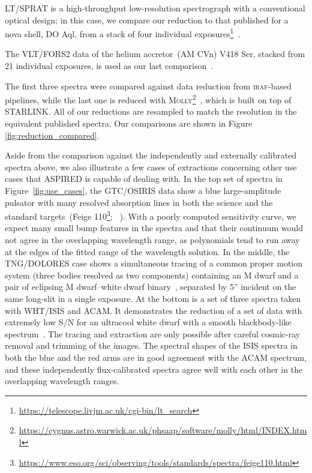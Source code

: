 \documentclass[linenumbers, twocolumn]{aastex631}
\begin{document}
LT/SPRAT is a high-throughput low-resolution spectrograph with
a conventional optical design; in this case, we compare our reduction to that
published for a nova shell, DO Aql, from a stack of four individual 
exposures\footnote{\url{https://telescope.livjm.ac.uk/cgi-bin/lt_search}}~\citep{2020MNRAS.499.2959H}. 

The VLT/FORS2 data
of the helium accretor~(AM CVn) V418 Ser, stacked from 21 individual exposures, is
used as our last comparison~\citep{2020MNRAS.496.1243G}. 

The first three spectra were 
compared against data reduction from \textsc{iraf}-based pipelines, while the
last one is reduced with \textsc{Molly}\footnote{
\url{https://cygnus.astro.warwick.ac.uk/phsaap/software/molly/html/INDEX.html}}~\citep{2019ascl.soft07012M},
which is built on top of \textsc{STARLINK}. All of our reductions are resampled to match
the resolution in the equivalent published spectra. Our comparisons are shown in Figure \ref{fig:reduction_compared}.

Aside from the comparison against the independently and externally calibrated
spectra above, we also illustrate a few cases of extractions concerning
other use cases that \textsc{ASPIRED} is capable of dealing with. In the top set
of spectra in Figure~\ref{fig:use_cases}, the GTC/OSIRIS data show a
blue large-amplitude pulsator with many resolved absorption lines in both the
science and the standard targets~(Feige 110\footnote{
\url{https://www.eso.org/sci/observing/tools/standards/spectra/feige110.html}};
~\citealp{2022MNRAS.511.4971M}). With a poorly computed sensitivity curve, we
expect many small bump features in the spectra and that their continuum would
not agree in the overlapping wavelength range, as polynomials tend to run away
at the edges of the fitted range of the wavelength solution. In the middle,
the TNG/DOLORES case shows a simultaneous tracing of a common proper
motion system (three bodies resolved as two components) containing an M dwarf
and a pair of eclipsing M dwarf--white dwarf binary~\citep{2022MNRAS.509.4171K},
separated by 5'' incident on the same long-slit in a single exposure.
At the bottom is a set of three spectra taken with WHT/ISIS and ACAM.
It demonstrates the reduction of a set of data with extremely low S/N
for an ultracool white dwarf with a smooth blackbody-like
spectrum~\citep{2020MNRAS.493.6001L}. The tracing and extraction are only
possible after careful cosmic-ray removal and trimming of the images. The
spectral shapes of the ISIS spectra in both the blue and the red arms are in good
agreement with the ACAM spectrum, and these independently flux-calibrated
spectra agree well with each other in the overlapping wavelength ranges.
\end{document}
